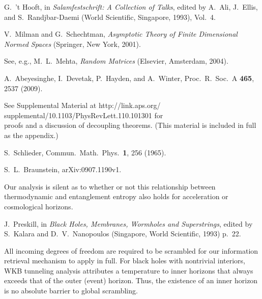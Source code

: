 \documentclass[twocolumn,aps,showpacs,prl]{revtex4}
\begin{document}
\begin{thebibliography}{16}
 G.\ 't Hooft,
in {\it Salamfestschrift: A Collection of Talks}, 
edited by A.\ Ali, J.\ Ellis, and S.\ Randjbar-Daemi
(World Scientific, Singapore, 1993), Vol.\ 4.

 V.\ Milman and G.\ Schechtman,
{\it Asymptotic Theory of Finite Dimensional Normed Spaces\/}
(Springer, New York, 2001).

 See, e.g., M.\ L.\ Mehta,
{\it Random Matrices\/}
(Elsevier, Amsterdam, 2004).

 A.\ Abeyesinghe, 
I.\ Devetak, P.\ Hayden, and A.\ Winter,
Proc.\ R.\ Soc.\ A {\bf 465}, 2537 (2009). 

 See Supplemental Material at
http://link.aps.org/\\
supplemental/10.1103/PhysRevLett.110.101301
for\\
proofs and a discussion of decoupling theorems.
(This material is included in full as the appendix.)

 S.\ Schlieder,
Commun.\ Math.\ Phys.\ {\bf 1}, 256 (1965).

 S.\ L.\ Braunstein, arXiv:0907.1190v1.

 Our analysis is silent as to whether or not this
relationship between thermodynamic and entanglement entropy also
holds for acceleration or cosmological horizons.


 J.\ Preskill,
in {\it Black Holes, Membranes, Wormholes and Superstrings},
edited by S.\ Kalara and D.\ V.\ Nanopoulos
(Singapore, World Scientific, 1993) p.~22.

 All incoming degrees of freedom are required to be scrambled
for our information retrieval mechanism to apply in full. For black
holes with nontrivial interiors,
WKB tunneling analysis attributes a temperature to inner horizons
that always exceeds that of the outer
(event) horizon. Thus, the existence of an inner horizon is no absolute
barrier to global scrambling.


\end{thebibliography}
\end{document}
